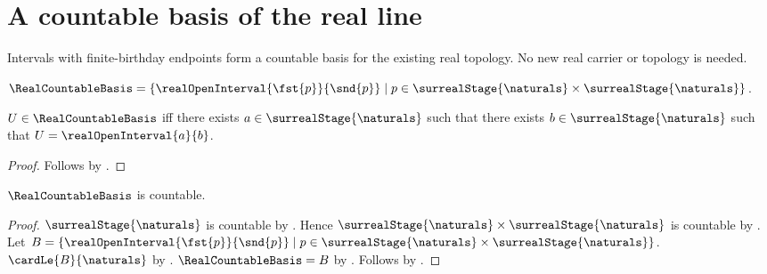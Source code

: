 \section{A countable basis of the real line}






Intervals with finite-birthday endpoints form a countable basis for the
existing real topology. No new real carrier or topology is needed.

\begin{definition}\label{real_countable_basis}
    $\RealCountableBasis=\{\realOpenInterval{\fst{p}}{\snd{p}}
        \mid p\in\surrealStage{\naturals}\times\surrealStage{\naturals}\}$.
\end{definition}

\begin{proposition}\label{real_countable_basis_iff}
    $U\in\RealCountableBasis$ iff there exists $a\in\surrealStage{\naturals}$ such that
        there exists $b\in\surrealStage{\naturals}$ such that $U=\realOpenInterval{a}{b}$.
\end{proposition}
\begin{proof}
    Follows by .
\end{proof}

\begin{theorem}\label{real_countable_basis_is_countable}
    $\RealCountableBasis$ is countable.
\end{theorem}
\begin{proof}
    $\surrealStage{\naturals}$ is countable by .
    Hence $\surrealStage{\naturals}\times\surrealStage{\naturals}$ is countable by
        .
    Let $B=\{\realOpenInterval{\fst{p}}{\snd{p}}
        \mid p\in\surrealStage{\naturals}\times\surrealStage{\naturals}\}$.
    $\cardLe{B}{\naturals}$ by .
    $\RealCountableBasis=B$ by .
    Follows by .
\end{proof}

